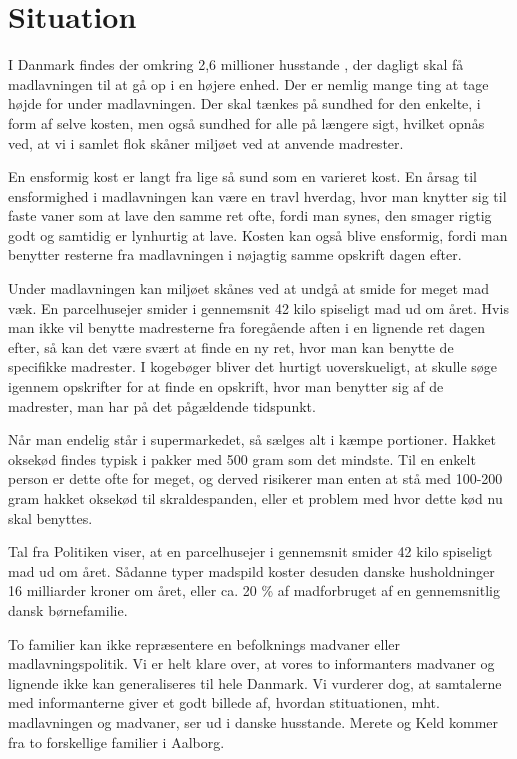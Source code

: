 \section{Situation}
\label{sec:situation}

I Danmark findes der omkring 2,6 millioner husstande \cite{husstande}, der dagligt skal få madlavningen til at gå op i en højere enhed. Der er nemlig mange ting at tage højde for under madlavningen. Der skal tænkes på sundhed for den enkelte, i form af selve kosten, men også sundhed for alle på længere sigt, hvilket opnås ved, at vi i samlet flok skåner miljøet ved at anvende madrester.

En ensformig kost er langt fra lige så sund som en varieret kost. En årsag til ensformighed i madlavningen kan være en travl hverdag, hvor man knytter sig til faste vaner som \fx at lave den samme ret ofte, fordi man synes, den smager rigtig godt og samtidig er lynhurtig at lave. Kosten kan også blive ensformig, fordi man benytter resterne fra madlavningen i nøjagtig samme opskrift dagen efter.

Under madlavningen kan miljøet skånes ved at undgå at smide for meget mad væk. En parcelhusejer smider i gennemsnit 42 kilo spiseligt mad ud om året. \cite{madspildpol} Hvis man ikke vil benytte madresterne fra foregående aften i en lignende ret dagen efter, så kan det være svært at finde en ny ret, hvor man kan benytte de specifikke madrester. I kogebøger bliver det hurtigt uoverskueligt, at skulle søge igennem opskrifter for at finde en opskrift, hvor man benytter sig af de madrester, man har på det pågældende tidspunkt. 

Når man endelig står i supermarkedet, så sælges alt i kæmpe portioner. Hakket oksekød findes typisk i pakker med 500 gram som det mindste. Til en enkelt person er dette ofte for meget, og derved risikerer man enten at stå med 100-200 gram hakket oksekød til skraldespanden, eller et problem med hvor dette kød nu skal benyttes.

Tal fra Politiken viser, at en parcelhusejer i gennemsnit smider 42 kilo spiseligt mad ud om året. \cite{madspildpol}
Sådanne typer madspild koster desuden danske husholdninger 16 milliarder kroner om året, eller ca. 20 \% af madforbruget af en gennemsnitlig dansk børnefamilie. \cite{madspild16}

To familier kan ikke repræsentere en befolknings madvaner eller madlavningspolitik. Vi er helt klare over, at vores to informanters madvaner og lignende ikke kan generaliseres til hele Danmark. Vi vurderer dog, at samtalerne med informanterne giver et godt billede af, hvordan stituationen, mht. madlavningen og madvaner, ser ud i danske husstande. Merete og Keld kommer fra to forskellige familier i Aalborg.

